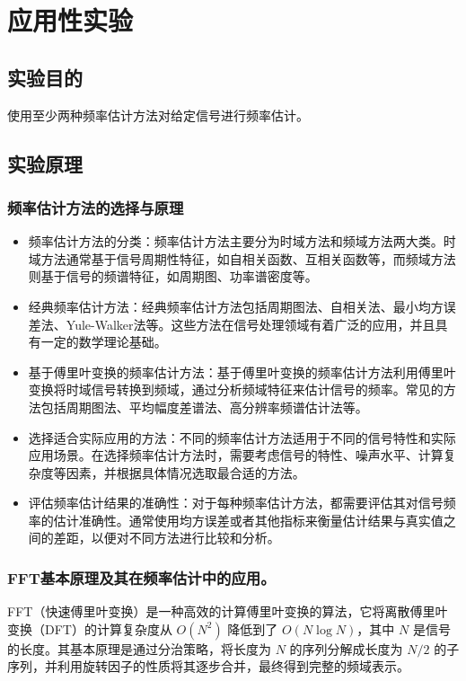 \documentclass[a4paper,12pt]{article}
\begin{document}
\section{应用性实验}
\subsection{实验目的}
使用至少两种频率估计方法对给定信号进行频率估计。

\subsection{实验原理}
\subsubsection{频率估计方法的选择与原理}
\begin{itemize}
    \item 频率估计方法的分类：频率估计方法主要分为时域方法和频域方法两大类。时域方法通常基于信号周期性特征，如自相关函数、互相关函数等，而频域方法则基于信号的频谱特征，如周期图、功率谱密度等。
    \item 经典频率估计方法：经典频率估计方法包括周期图法、自相关法、最小均方误差法、Yule-Walker法等。这些方法在信号处理领域有着广泛的应用，并且具有一定的数学理论基础。
    \item 基于傅里叶变换的频率估计方法：基于傅里叶变换的频率估计方法利用傅里叶变换将时域信号转换到频域，通过分析频域特征来估计信号的频率。常见的方法包括周期图法、平均幅度差谱法、高分辨率频谱估计法等。
    \item 选择适合实际应用的方法：不同的频率估计方法适用于不同的信号特性和实际应用场景。在选择频率估计方法时，需要考虑信号的特性、噪声水平、计算复杂度等因素，并根据具体情况选取最合适的方法。
    \item 评估频率估计结果的准确性：对于每种频率估计方法，都需要评估其对信号频率的估计准确性。通常使用均方误差或者其他指标来衡量估计结果与真实值之间的差距，以便对不同方法进行比较和分析。
\end{itemize}

\subsubsection{FFT基本原理及其在频率估计中的应用。}
FFT（快速傅里叶变换）是一种高效的计算傅里叶变换的算法，它将离散傅里叶变换（DFT）的计算复杂度从 \(O(N^2)\) 降低到了 \(O(N \log N)\)，其中 \(N\) 是信号的长度。其基本原理是通过分治策略，将长度为 \(N\) 的序列分解成长度为 \(N/2\) 的子序列，并利用旋转因子的性质将其逐步合并，最终得到完整的频域表示。
\end{document}

